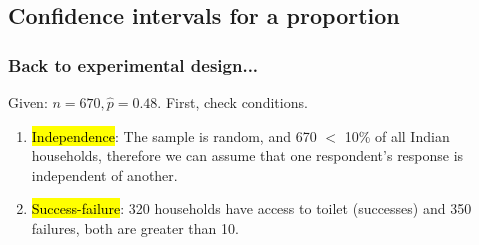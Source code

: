 \documentclass[notes,11pt, aspectratio=169]{beamer}
\begin{document}
%
%
%
%
%

\subsection{Confidence intervals for a proportion}


\begin{frame}
\frametitle{Back to experimental design...}


\pause
Given: $n = 670, \hat{p} = 0.48$. First, check conditions.

\pause
\begin{enumerate}[1.]
\item \hl{Independence}: The sample is random, and 670 $<$ 10\% of all Indian households, therefore we can assume that one respondent's response is independent of another.
\pause
\item \hl{Success-failure}: 320 households have access to toilet (successes) and 350 failures, both are greater than 10.
\end{enumerate}

\end{frame}
\end{document}
